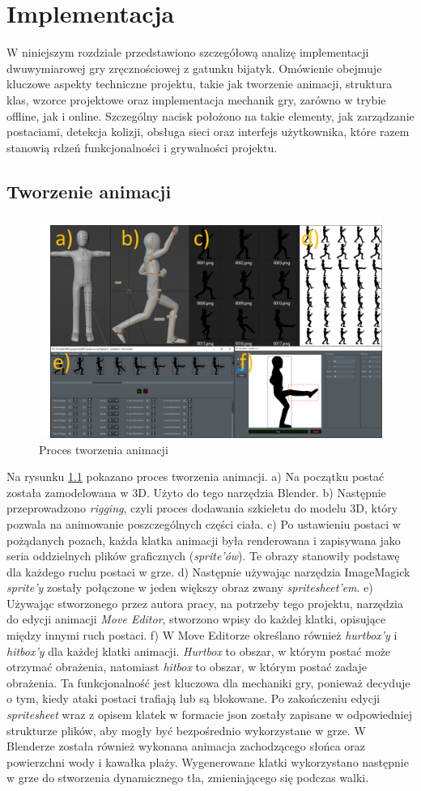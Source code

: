 \chapter{Implementacja}
W niniejszym rozdziale przedstawiono szczegółową analizę implementacji dwuwymiarowej gry zręcznościowej z gatunku bijatyk. Omówienie obejmuje kluczowe aspekty techniczne projektu, takie jak tworzenie animacji, struktura klas, wzorce projektowe oraz implementacja mechanik gry, zarówno w trybie offline, jak i online. Szczególny nacisk położono na takie elementy, jak zarządzanie postaciami, detekcja kolizji, obsługa sieci oraz interfejs użytkownika, które razem stanowią rdzeń funkcjonalności i grywalności projektu.
\section{Tworzenie animacji}
\begin{figure}
	\centering
		\includegraphics[width=0.64\linewidth]{rys03/animacja}
	\caption{Proces tworzenia animacji}
	\label{fig:animacja}
\end{figure}
Na rysunku \ref{fig:animacja} pokazano proces tworzenia animacji. a) Na początku postać została zamodelowana w 3D. Użyto do tego narzędzia Blender. b) Następnie przeprowadzono \emph{rigging}, czyli proces dodawania szkieletu do modelu 3D, który pozwala na animowanie poszczególnych części ciała. c) Po ustawieniu postaci w pożądanych pozach, każda klatka animacji była renderowana i zapisywana jako seria oddzielnych plików graficznych (\emph{sprite'ów}). Te obrazy stanowiły podstawę dla każdego ruchu postaci w grze. d) Następnie używając narzędzia ImageMagick \emph{sprite'y} zostały połączone w jeden większy obraz zwany \emph{spritesheet'em}. e) Używając stworzonego przez autora pracy, na potrzeby tego projektu, narzędzia do edycji animacji \emph{Move Editor}, stworzono wpisy do każdej klatki, opisujące między innymi ruch postaci. f) W Move Editorze określano również \emph{hurtbox'y} i \emph{hitbox'y} dla każdej klatki animacji. \emph{Hurtbox} to obszar, w którym postać może otrzymać obrażenia, natomiast \emph{hitbox} to obszar, w którym postać zadaje obrażenia. Ta funkcjonalność jest kluczowa dla mechaniki gry, ponieważ decyduje o tym, kiedy ataki postaci trafiają lub są blokowane. Po zakończeniu edycji \emph{spritesheet} wraz z opisem klatek w formacie json zostały zapisane w odpowiedniej strukturze plików, aby mogły być bezpośrednio wykorzystane w grze.
W Blenderze została również wykonana animacja zachodzącego słońca oraz powierzchni wody i kawałka plaży. Wygenerowane klatki wykorzystano następnie w grze do stworzenia dynamicznego tła, zmieniającego się podczas walki.
